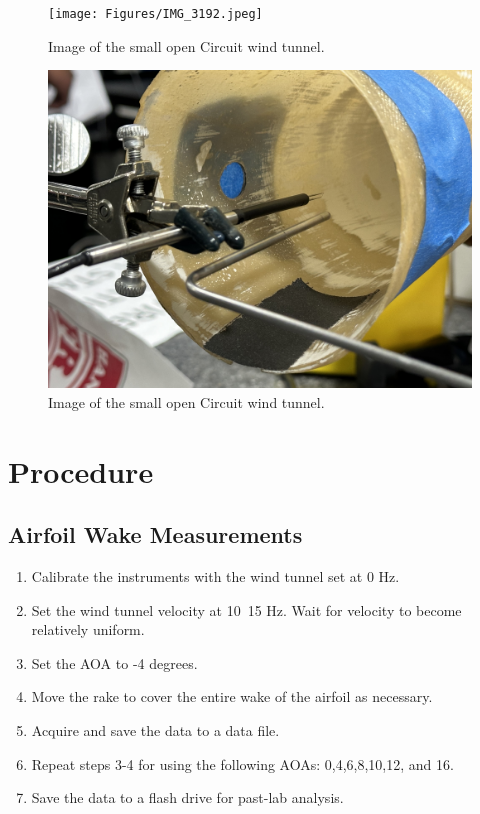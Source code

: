 \begin{figure}[htpb]
    \centering
    \texttt{[image: Figures/IMG\_3192.jpeg]}
    \caption[Image of the small open Circuit wind tunnel.]{Image of the small open Circuit wind tunnel.}
    \label{fig: OpenCircutWindTunnel}
\end{figure}

\begin{figure}[htpb]
    \centering
    \includegraphics[width=0.75\linewidth]{Figures/IMG_3199.jpeg}
    \caption[Image of the Hot Wire .]{Image of the small open Circuit wind tunnel.}
    \label{fig: OpenCircutWindTunnel}
\end{figure}

\section{Procedure}\label{sec:procedures}
\subsection{Airfoil Wake Measurements}
\begin{enumerate}
\item Calibrate the instruments with the wind tunnel set at 0 Hz.
\item Set the wind tunnel velocity at 10~15 Hz. Wait for velocity to become relatively uniform. 
\item Set the AOA to -4 degrees. 
\item Move the rake to cover the entire wake of the airfoil as necessary.
\item Acquire and save the data to a data file.
\item Repeat steps 3-4 for using the following AOAs: 0,4,6,8,10,12, and 16.
\item Save the data to a flash drive for past-lab analysis.
\end{enumerate}

